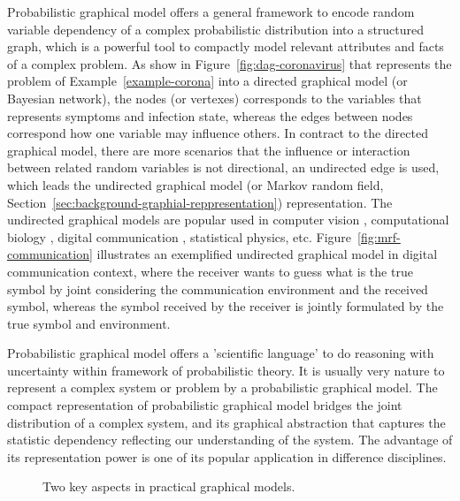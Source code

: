 Probabilistic graphical model offers a general framework to encode random variable dependency of a complex probabilistic distribution into a structured graph, which is a powerful tool to compactly model relevant attributes and facts of a complex problem. As show in Figure~\ref{fig:dag-coronavirus} that represents the problem of Example~\ref{example-corona} into a directed graphical model (or Bayesian network), the nodes (or vertexes) corresponds to the variables that represents symptoms and infection state, whereas the edges between nodes correspond how one variable may influence others. In contract to the directed graphical model, there are more scenarios that the influence or interaction between related random variables is not directional, an undirected edge is used, which leads the undirected graphical model (or Markov random field, Section~\ref{sec:background-graphial-reppresentation}) representation. The undirected graphical models are popular used in computer vision \cite{}, computational biology \cite{}, digital communication \cite{}, statistical physics, etc. Figure~\ref{fig:mrf-communication} illustrates an exemplified undirected graphical model in digital communication context, where the receiver wants to guess what is the true symbol by joint considering the communication environment and the received symbol, whereas the symbol received by the receiver is jointly formulated by the true symbol and environment.

Probabilistic graphical model offers a 'scientific language' to do reasoning with uncertainty within framework of probabilistic theory. It is usually very nature to represent a complex system or problem by a probabilistic graphical model. The compact representation of probabilistic graphical model bridges the joint distribution of a complex system, and its graphical abstraction that captures the statistic dependency reflecting our understanding of the system. The advantage of its representation power is one of its popular application in difference disciplines.

\begin{figure}[!t]
  \centering
  \caption{Two key aspects in practical graphical models.}
  \label{fig:intro-pgm}
  \hspace{1cm}
\end{figure}

